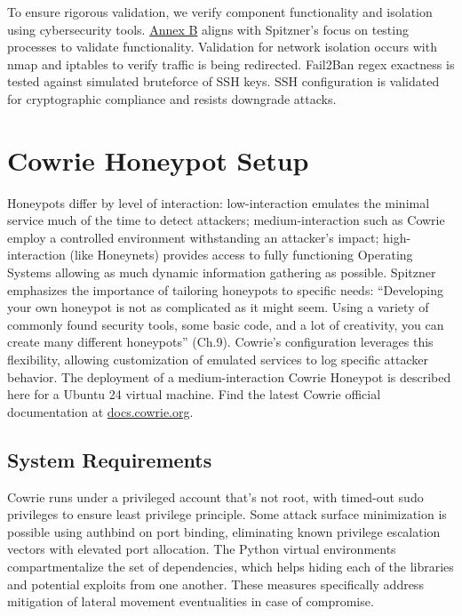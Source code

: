 \documentclass{cls/ULBreport}
\begin{document}
        To ensure rigorous validation, we verify component functionality and isolation using cybersecurity tools. \hyperref[annexes:network]{Annex B} aligns with Spitzner's focus on testing processes to validate functionality. Validation for network isolation occurs with nmap and iptables to verify traffic is being redirected. Fail2Ban regex exactness is tested against simulated bruteforce of SSH keys. SSH configuration is validated for cryptographic compliance and resists downgrade attacks.
        


    \section{Cowrie Honeypot Setup}
    Honeypots differ by level of interaction: low-interaction emulates the minimal service much of the time to detect attackers; medium-interaction such as Cowrie employ a controlled environment withstanding an attacker's impact; high-interaction (like Honeynets) provides access to fully functioning Operating Systems allowing as much dynamic information gathering as possible.
    Spitzner emphasizes the importance of tailoring honeypots to specific needs: \enquote{Developing your own honeypot is not as complicated as it might seem. Using a variety of commonly found security tools, some basic code, and a lot of creativity, you can create many different honeypots} (Ch.9). Cowrie’s configuration leverages this flexibility, allowing customization of emulated services to log specific attacker behavior. The deployment of a medium-interaction Cowrie Honeypot is described here for a Ubuntu 24 virtual machine. Find the latest Cowrie official documentation at \href{https://docs.cowrie.org/en/latest/INSTALL.html}{docs.cowrie.org}.
    
\label{sec:cowrie}
    \subsection{System Requirements}
    Cowrie runs under a privileged account that's not root, with timed-out sudo privileges to ensure least privilege principle. Some attack surface minimization is possible using authbind on port binding, eliminating known privilege escalation vectors with elevated port allocation. The Python virtual environments compartmentalize the set of dependencies, which helps hiding each of the libraries and potential exploits from one another. These measures specifically address mitigation of lateral movement eventualities in case of compromise. 
    
\end{document}

